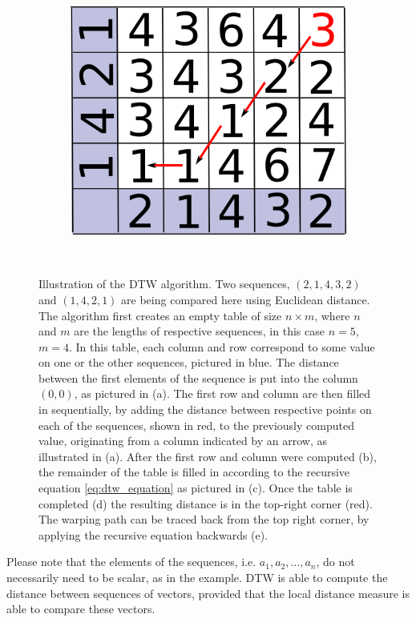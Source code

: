 \documentclass[parskip]{cs4rep}
\begin{document}
\begin{figure}
\begin{subfigure}[b]{0.3\textwidth}
       \includegraphics[width=\textwidth]{figures/DTW/worked-out/step-5.png}
       \caption{}
       \label{fig:DTW:example:5}
   \end{subfigure}
   ~
   \caption{Illustration of the DTW algorithm. Two sequences, $(2,1,4,3,2)$ and $(1,4,2,1)$ are being compared here using Euclidean distance. The algorithm first creates an empty table of size $n \times m$, where $n$ and $m$ are the lengths of respective sequences, in this case $n=5$, $m=4$. In this table, each column and row correspond to some value on one or the other sequences, pictured in blue.
The distance between the first elements of the sequence is put into the column $(0,0)$, as pictured in (a). 
The first row and column are then filled in sequentially, by adding the distance between respective points on each of the sequences, shown in red, to the previously computed value, originating from a column indicated by an arrow, as illustrated in (a). After the first row and column were computed (b), the remainder of the table is filled in according to the recursive equation \ref{eq:dtw_equation} as pictured in (c). Once the table is completed (d) the resulting distance is in the top-right corner (red). The warping path can be traced back from the top right corner, by applying the recursive equation backwards (e).}
   
   \label{fig:DTW:example}
\end{figure}


Please note that the elements of the sequences, i.e. $a_1, a_2, ..., a_n$, do not necessarily need to be scalar, as in the example. DTW is able to compute the distance between sequences of vectors, provided that the local distance measure is able to compare these vectors. 
\end{document}
